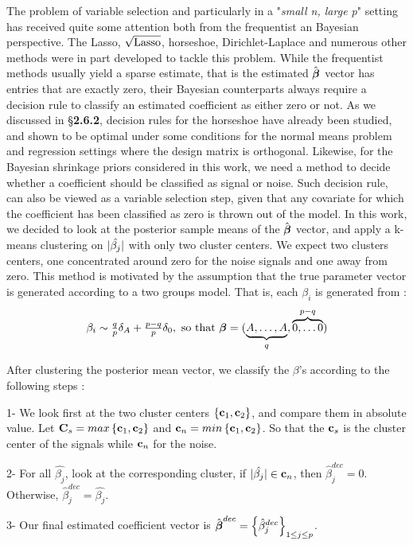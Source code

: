 \documentclass[10pt]{article}
\begin{document}
The problem of variable selection and particularly in a "\textit{small n, large p}" setting has received quite some attention both from  the frequentist an Bayesian perspective. The Lasso, $\sqrt{\text{\rm{Lasso}}}$, horseshoe, Dirichlet-Laplace and numerous other methods were in part developed to tackle this problem. While the frequentist methods usually yield a sparse estimate, that is the estimated $\hat{\boldsymbol{\beta}}$ vector has entries that are exactly zero, their Bayesian counterparts always require a decision rule to classify an estimated coefficient as either zero or not. As we discussed in \S \textbf{2.6.2}, decision rules for the horseshoe have already been studied, and shown to be optimal under some conditions for the normal means problem and regression settings where the design matrix is orthogonal. Likewise, for the Bayesian shrinkage priors considered in this work, we need a method to decide whether a coefficient should be classified as signal or noise. Such decision rule, can also be viewed as a variable selection step, given that any covariate for which the coefficient has been classified as zero is thrown out of the model. In this work, we decided to look at the posterior sample means of the $\hat{\boldsymbol{\beta}}$ vector, and apply a k-means clustering on $\lvert\hat{\beta_j}\rvert $ with only two cluster centers. We expect two clusters centers, one concentrated around zero for the noise signals and one away from zero. This method is motivated by the assumption that the true parameter vector is generated according to a two groups model. That is, each $\beta_i$ is generated from : 
$$ \beta_i \sim \tfrac{q}{p} \delta_{A} + \tfrac{p-q}{p} \delta_{0}, \ \text{so that }  \boldsymbol{\beta} = ( \underbrace{ A, \ldots ,A}_{q}, \overbrace{0, \ldots 0}^{p-q} ) $$

After clustering the posterior mean vector, we classify the $\beta$'s according to the following steps : 
\ben
\item[1-] We look first at the two cluster centers $\left\lbrace {\bf c}_1 , {\bf c}_2 \right\rbrace $, and compare them in absolute value. Let ${\bf C}_s = max\left\lbrace {\bf c}_1 , {\bf c}_2 \right\rbrace$ and ${\bf c}_n = min\left\lbrace {\bf c}_1 , {\bf c}_2 \right\rbrace$. So that the ${\bf c}_s$ is the cluster center of the signals while ${\bf c}_n$ for the noise.
\item[2-] For all $\hat{\beta_j}$, look at the corresponding cluster, if $\lvert\hat{\beta_j}\rvert \in {\bf c}_n $, then $\hat{\beta}_j^{dec}= 0$. Otherwise, $\hat{\beta}_j^{dec} = \hat{\beta_j}$.
\item[3-] Our final estimated coefficient vector is $\hat{\boldsymbol{\beta}}^{dec} = \left\lbrace \hat{\beta}^{dec}_{j} \right\rbrace_{1\leq j \leq p}$.
\een
\end{document}
